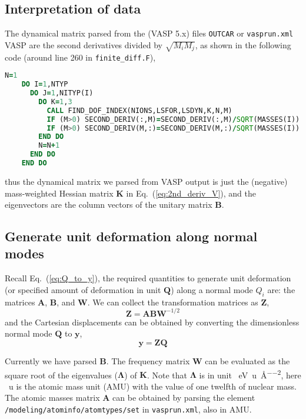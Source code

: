 \documentclass[a4paper,notitlepage,preprint]{revtex4-1}
\newcommand\mbf{\mathbf}
\begin{document}
\subsection{Interpretation of data}
The dynamical matrix parsed from the (VASP 5.x) files \verb|OUTCAR| or \verb|vasprun.xml| VASP are the second derivatives divided by $\sqrt{M_i M_j}$, as shown in the following code (around line 260 in \verb|finite_diff.F|),
\begin{lstlisting}[language=Fortran,firstnumber=259]
    N=1
    DO I=1,NTYP
      DO J=1,NITYP(I)
        DO K=1,3
          CALL FIND_DOF_INDEX(NIONS,LSFOR,LSDYN,K,N,M)
          IF (M>0) SECOND_DERIV(:,M)=SECOND_DERIV(:,M)/SQRT(MASSES(I))
          IF (M>0) SECOND_DERIV(M,:)=SECOND_DERIV(M,:)/SQRT(MASSES(I))
        END DO
        N=N+1
      END DO
    END DO
\end{lstlisting}
\noindent thus the dynamical matrix we parsed from VASP output is just the (negative) mass-weighted Hessian matrix $\mbf{K}$ in Eq.~(\ref{eq:2nd_deriv_V}), and the eigenvectors are the column vectors of the unitary matrix $\mbf{B}$. 

\subsection{Generate unit deformation along normal modes}
Recall Eq.~(\ref{eq:Q_to_y}), the required quantities to generate unit deformation (or specified amount of deformation in unit $\mbf{Q}$) along a normal mode $Q_i$ are: the matrices $\mbf{A}$, $\mbf{B}$, and $\mbf{W}$. We can collect the transformation matrices as $\mbf{Z}$,
\begin{equation}
	\mbf{Z} = \mbf{AB}\mbf{W}^{-1/2}
	\label{eq:Z}
\end{equation}
and the Cartesian displacements can be obtained by converting the dimensionless normal mode $\mbf{Q}$ to $\mbf{y}$,
\begin{equation}
	\mbf{y} = \mbf{ZQ}
	\label{eq:Q_to_y_tot}
\end{equation}

Currently we have parsed $\mbf{B}$. The frequency matrix $\mbf{W}$ can be evaluated as the square root of the eigenvalues ($\bm{\Lambda}$) of $\mbf{K}$. Note that $\bm{\Lambda}$ is in unit \SI{}{\electronvolt\per\atomicmassunit\per\angstrom\tothe{2}}, here \SI{}{\atomicmassunit} is the atomic mass unit (AMU) with the value of one twelfth of  nuclear mass. The atomic masses matrix $\mbf{A}$ can be obtained by parsing the element \verb|/modeling/atominfo/atomtypes/set| in \verb|vasprun.xml|, also in AMU.
\end{document}
